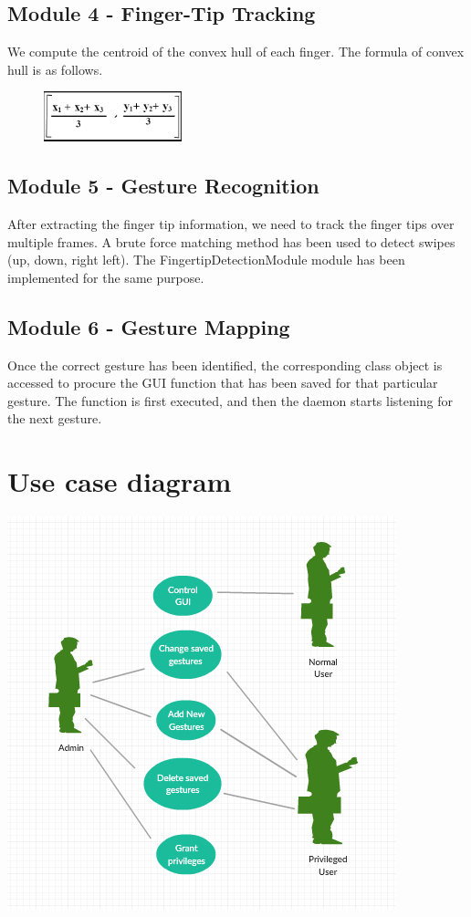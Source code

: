 \documentclass[11pt]{report}
\begin{document}
\subsection{Module 4 - Finger-Tip Tracking}
We compute the centroid of the convex hull of each finger. The formula of convex hull is as follows.
\begin{center}
    
\begin{figure}[H]
    \includegraphics[width=4cm]{centroid.png}
\end{figure}
\end{center}


\subsection{Module 5 - Gesture Recognition}
After extracting the finger tip information, we need to track the finger tips over multiple frames. 
A brute force matching method has been used to detect swipes (up, down, right left). The FingertipDetectionModule
module has been implemented for the same purpose.

\subsection{Module 6 - Gesture Mapping}

Once the correct gesture has been identified, 
the corresponding class object is accessed to procure the GUI function that has been saved 
for that particular gesture. The function is first executed, and then the daemon starts listening 
for the next gesture.

\section{Use case diagram}
\begin{center}
    \includegraphics{usecase.png}
\end{center}
\end{document}
